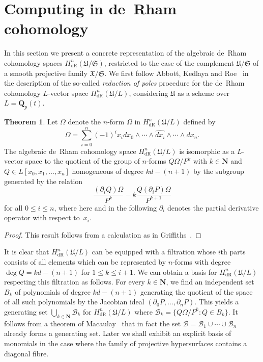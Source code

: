 \documentclass[a4paper,11pt]{article}
\numberwithin{equation}{section}
\newcommand{\NN}{\mathbf{N}} %
\newcommand{\QQ}{\mathbf{Q}} %
\providecommand{\HdR}{H_{\text{dR}}}    %
\providecommand{\cB}{\mathcal{B}} %
\theoremstyle{definition}
\newtheorem{thm}{Theorem}[section]
\begin{document}
\section{Computing in de~Rham cohomology}

In this section we present a concrete representation of the algebraic 
de~Rham cohomology spaces $\HdR^{n}(\mathfrak{U}/\mathfrak{S})$, 
restricted to the case of the complement $\mathfrak{U}/\mathfrak{S}$ 
of a smooth projective family $\mathfrak{X} / \mathfrak{S}$.  We first 
follow Abbott, Kedlaya and Roe~\citep[Remark~3.2.5]{AbbottKedlayaRoe2006} 
in the description of the so-called \emph{reduction of poles} procedure for 
the de~Rham cohomology $L$-vector space $\HdR^{n}(\mathfrak{U} / L)$, 
considering $\mathfrak{U}$ as a scheme over $L = \QQ_{p}(t)$.

\begin{thm}
Let $\Omega$ denote the $n$-form $\Omega$ in $\HdR^{n}(\mathfrak{U}/L)$ 
defined by 
\begin{equation}
\Omega = \sum_{i=0}^n (-1)^i x_i d x_0 \wedge \dotsb \wedge \widehat{d x_i} \wedge \dotsb \wedge d x_n.
\end{equation}
The algebraic de~Rham cohomology space $\HdR^{n}(\mathfrak{U}/L)$ is 
isomorphic as a $L$-vector space to the quotient of the group of $n$-forms 
$Q \Omega / P^k$ with $k \in \NN$ and $Q \in L[x_0, x_1, \dotsc, x_n]$ 
homogeneous of degree $k d - (n + 1)$ by the subgroup generated by the 
relation 
\begin{equation} \label{eq:deRhamRel}
\frac{(\partial_i Q) \Omega}{P^k} - k \frac{Q (\partial_i P) \Omega}{P^{k+1}}
\end{equation}
for all $0 \leq i \leq n$, where here and in the following $\partial_i$ 
denotes the partial derivative operator with respect to~$x_i$.
\end{thm}

\begin{proof}
This result follows from a calculation as 
in Griffiths~\citep[\S 4]{Griffiths1969}.
\end{proof}

It is clear that $\HdR^{n}(\mathfrak{U}/L)$ can be equipped with a 
filtration whose $i$th parts consists of all elements which can be 
represented by $n$-forms with degree $\deg Q = kd - (n + 1)$ for 
$1 \leq k \leq i + 1$. We can obtain a basis for $\HdR^{n}(\mathfrak{U}/L)$ 
respecting this filtration as follows.  For every $k \in \NN$, we find 
an independent set $B_k$ of polynomials of degree $kd-(n+1)$ generating 
the quotient of the space of all such polynomials by the Jacobian ideal 
$(\partial_0 P, \dotsc, \partial_n P)$.  This yields a generating set 
$\bigcup_{k \in \NN} \cB_k$ for $\HdR^n(\mathfrak{U}/L)$ where 
$\cB_k = \{Q \Omega / P^k : Q \in B_k\}$.  It follows from a theorem of 
Macaulay~\citep[\S 4, (4.11)]{Griffiths1969} that in fact the set 
$\cB = \cB_1 \cup \dotsb \cup \cB_n$ already forms a generating set.  
Later we shall exhibit an explicit basis of monomials in the case where 
the family of projective hypersurfaces contains a diagonal fibre.
\end{document}
